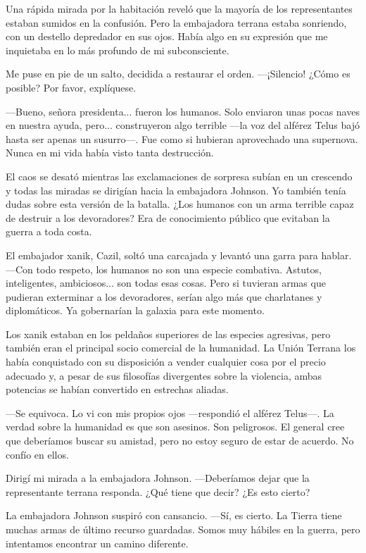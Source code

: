 Una rápida mirada por la habitación reveló que la mayoría de los representantes estaban sumidos en la confusión. Pero la embajadora terrana estaba sonriendo, con un destello depredador en sus ojos. Había algo en su expresión que me inquietaba en lo más profundo de mi subconsciente.

Me puse en pie de un salto, decidida a restaurar el orden. —¡Silencio! ¿Cómo es posible? Por favor, explíquese.

—Bueno, señora presidenta... fueron los humanos. Solo enviaron unas pocas naves en nuestra ayuda, pero... construyeron algo terrible —la voz del alférez Telus bajó hasta ser apenas un susurro—. Fue como si hubieran aprovechado una supernova. Nunca en mi vida había visto tanta destrucción.

El caos se desató mientras las exclamaciones de sorpresa subían en un crescendo y todas las miradas se dirigían hacia la embajadora Johnson. Yo también tenía dudas sobre esta versión de la batalla. ¿Los humanos con un arma terrible capaz de destruir a los devoradores? Era de conocimiento público que evitaban la guerra a toda costa.

El embajador xanik, Cazil, soltó una carcajada y levantó una garra para hablar. —Con todo respeto, los humanos no son una especie combativa. Astutos, inteligentes, ambiciosos... son todas esas cosas. Pero si tuvieran armas que pudieran exterminar a los devoradores, serían algo más que charlatanes y diplomáticos. Ya gobernarían la galaxia para este momento.

Los xanik estaban en los peldaños superiores de las especies agresivas, pero también eran el principal socio comercial de la humanidad. La Unión Terrana los había conquistado con su disposición a vender cualquier cosa por el precio adecuado y, a pesar de sus filosofías divergentes sobre la violencia, ambas potencias se habían convertido en estrechas aliadas.

—Se equivoca. Lo vi con mis propios ojos —respondió el alférez Telus—. La verdad sobre la humanidad es que son asesinos. Son peligrosos. El general cree que deberíamos buscar su amistad, pero no estoy seguro de estar de acuerdo. No confío en ellos.

Dirigí mi mirada a la embajadora Johnson. —Deberíamos dejar que la representante terrana responda. ¿Qué tiene que decir? ¿Es esto cierto?

La embajadora Johnson suspiró con cansancio. —Sí, es cierto. La Tierra tiene muchas armas de último recurso guardadas. Somos muy hábiles en la guerra, pero intentamos encontrar un camino diferente.

